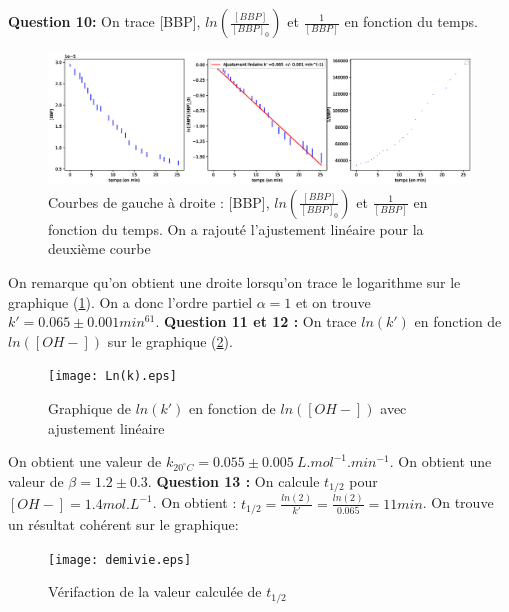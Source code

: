 \documentclass[12pt]{article}
\begin{document}
\newpage
\textbf{Question 10:}
On trace [BBP], $ln \left(\frac{[BBP]}{[BBP]_0}\right)$ et $\frac{1}{[BBP]}$ en fonction du temps.

\begin{figure}[h!]
    \begin{center}
        \includegraphics[width=1\linewidth]{3CourbesCinétiques.eps}
        \caption{Courbes de gauche à droite : [BBP], $ln \left(\frac{[BBP]}{[BBP]_0}\right)$ et $\frac{1}{[BBP]}$ en fonction du temps. On a rajouté l'ajustement linéaire pour la deuxième courbe}
        \label{img:3courbes}
    \end{center}
\end{figure}

On remarque qu'on obtient une droite lorsqu'on trace le logarithme sur le graphique (\ref{img:3courbes}).
On a donc l'ordre partiel $\alpha =1$ et on trouve $k'=0.065 \pm 0.001 min^{61}$.
\newpage
\textbf{Question 11 et 12 :} On trace $ln(k')$ en fonction de $ln([OH-])$ sur le graphique (\ref{img:lnk}). 
\begin{figure}[h!]
    \begin{center}
        \texttt{[image: Ln(k).eps]}
        \caption{Graphique de $ln(k')$ en fonction de $ln([OH-])$ avec ajustement linéaire}
        \label{img:lnk}
    \end{center}
\end{figure}

On obtient une valeur de $k_{20 ^\circ C}=0.055 \pm 0.005 \ L.mol^{-1}.min^{-1}$.
On obtient une valeur de $\beta = 1.2 \pm 0.3$.
\newpage
\textbf{Question 13 :}
On calcule $t_{1/2}$ pour $[OH-]=1.4 mol.L^{-1}$. On obtient : $t_{1/2}=\frac{ln(2)}{k'}=\frac{ln(2)}{0.065}=11 min$.
On trouve un résultat cohérent sur le graphique:
\begin{figure}[h!]
    \begin{center}
        \texttt{[image: demivie.eps]}
        \caption{Vérifaction de la valeur calculée de $t_{1/2}$}
        \label{img3:demivie}
    \end{center}
\end{figure}
\end{document}
